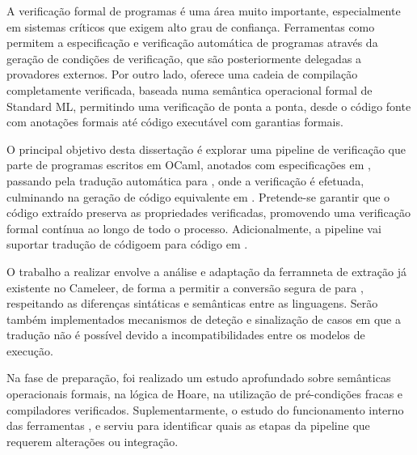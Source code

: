 
%

A verificação formal de programas é uma área muito importante, especialmente em sistemas críticos que exigem 
alto grau de confiança. Ferramentas como \whythree permitem a especificação e verificação automática de programas 
através da geração de condições de verificação, que são posteriormente delegadas a provadores externos. Por outro lado, 
\cml oferece uma cadeia de compilação completamente verificada, baseada numa semântica operacional formal de Standard ML,
permitindo uma verificação de ponta a ponta, desde o código fonte com anotações formais até código executável com garantias 
formais.

O principal objetivo desta dissertação é explorar uma pipeline de verificação que parte de programas escritos em OCaml, 
anotados com especificações em \gospel, passando pela tradução automática para \whyml, onde a verificação é efetuada, culminando 
na geração de código equivalente em \cml. Pretende-se garantir que o código extraído preserva as propriedades verificadas, 
promovendo uma verificação formal contínua ao longo de todo o processo. Adicionalmente, a pipeline vai suportar tradução 
de códigoem  \cml para código em \ocaml.

O trabalho a realizar envolve a análise e adaptação da ferramneta de extração já existente no Cameleer, de forma a permitir 
a conversão segura de \ocaml para \cml, respeitando as diferenças sintáticas e semânticas entre as linguagens. Serão também 
implementados mecanismos de deteção e sinalização de casos em que a tradução não é possível devido a incompatibilidades entre 
os modelos de execução.

Na fase de preparação, foi realizado um estudo aprofundado sobre semânticas operacionais formais, na lógica de Hoare, 
na utilização de pré-condições fracas e compiladores verificados. Suplementarmente, o estudo do funcionamento interno das 
ferramentas \whythree, \cameleer e \cml serviu para identificar quais as etapas da pipeline que requerem alterações ou integração.


